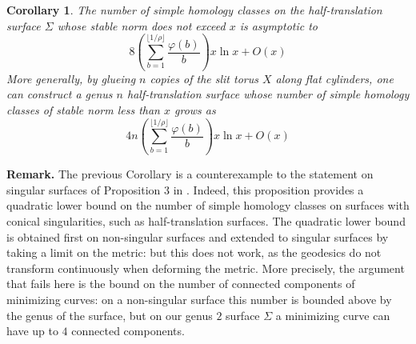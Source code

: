 \documentclass{article}
\newtheorem{cor}{Corollary}[thm]
\theoremstyle{definition}
\begin{document}
\begin{cor}
    The number of simple homology classes on the half-translation surface $\Sigma$ whose stable norm does not exceed $x$ is asymptotic to $$ 8  \left(\sum_{b=1}^{\lfloor 1/\rho \rfloor} \frac{\varphi(b)}{b}\right )  x \ln x + O(x)$$
    More generally, by glueing $n$ copies of the slit torus $X$ along flat cylinders, one can construct a genus $n$ half-translation surface whose number of simple homology classes of stable norm less than $x$ grows as
    $$ 4n  \left(\sum_{b=1}^{\lfloor 1/\rho \rfloor} \frac{\varphi(b)}{b}\right )  x \ln x + O(x)$$
\end{cor}

{\bf Remark.} The previous Corollary is a counterexample to the statement on singular surfaces of Proposition 3 in \cite{Gut-Mas}. Indeed, this proposition provides a quadratic lower bound on the number of simple homology classes on surfaces with conical singularities, such as half-translation surfaces. The quadratic lower bound is obtained first on non-singular surfaces and extended to singular surfaces by taking a limit on the metric: but this does not work, as the geodesics do not transform continuously when deforming the metric. More precisely, the argument that fails here is the bound on the number of connected components of minimizing curves: on a non-singular surface this number is bounded above by the genus of the surface, but on our genus $2$ surface $\Sigma$ a minimizing curve can have up to $4$ connected components. \\ \\
\end{document}
